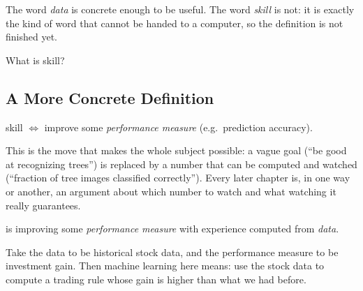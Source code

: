 The word \emph{data} is concrete enough to be useful. The word \emph{skill} is
not: it is exactly the kind of word that cannot be handed to a computer, so the
definition is not finished yet.

\begin{question}
    What is skill?
\end{question}

\subsection{A More Concrete Definition}

\begin{intuition}
    skill \(\iff\) improve some \emph{performance measure}
    (e.g.\ prediction accuracy).
\end{intuition}

This is the move that makes the whole subject possible: a vague goal (``be
good at recognizing trees'') is replaced by a number that can be computed and
watched (``fraction of tree images classified correctly''). Every later chapter
is, in one way or another, an argument about which number to watch and what
watching it really guarantees.

\begin{definition}\label{def:ml-performance}
     is improving some \emph{performance measure} with
    experience computed from \emph{data}.
\end{definition}

\begin{center}
\end{center}

\begin{eg}
    Take the data to be historical stock data, and the performance measure to be
    investment gain. Then machine learning here means: use the stock data to
    compute a trading rule whose gain is higher than what we had before.
    \begin{center}
    \end{center}
\end{eg}

